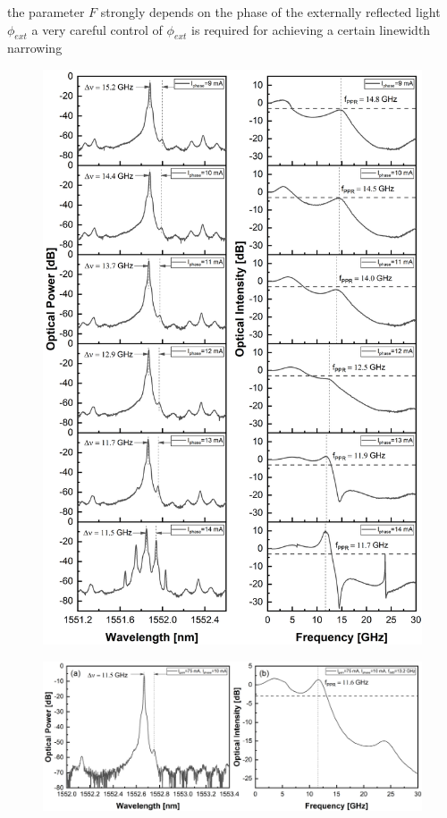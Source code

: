 the parameter $F$ strongly depends on the phase of the externally reflected light $\phi_{ext}$ a very careful control of $\phi_{ext}$ is required for achieving a certain linewidth narrowing


\begin{figure}[!htb]
    \centering
    \includegraphics[width=\linewidth]{figures/spectra_and_bandwidth_6559.png}
    \caption{}
    \label{fig:spectra_and_bandwidth_6559}
\end{figure}

\begin{figure}[!htb]
    \centering
    \includegraphics[width=\linewidth]{figures/spectrum_and_bandwidth_6557.png}
    \caption{}
    \label{fig:spectra_and_bandwidth_6557}
\end{figure}

